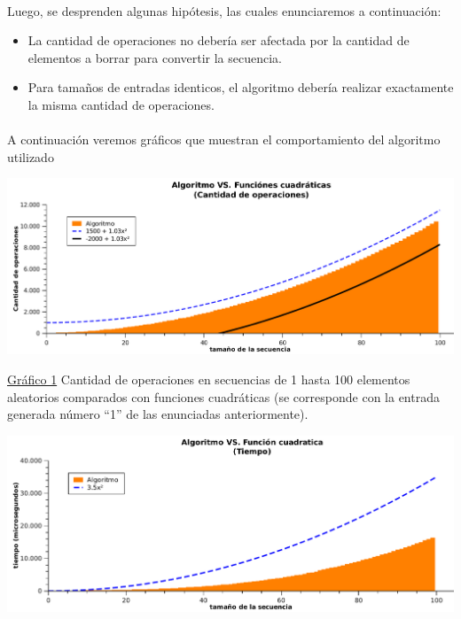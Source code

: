 \paragraph{}
Luego, se desprenden algunas hipótesis, las cuales enunciaremos a continuación:
\begin{itemize}
  
  \item La cantidad de operaciones no debería ser afectada por la cantidad de elementos a borrar para convertir la secuencia.

  \item Para tamaños de entradas identicos, el algoritmo debería realizar exactamente la misma cantidad de operaciones.

\end{itemize}




\paragraph{}
A continuación veremos gráficos que muestran el comportamiento del algoritmo utilizado


 \vspace*{1cm}
\hspace*{-2.1cm}\includegraphics[width=475pt]{../ej1/graficos/operaciones100.pdf}

\underline{Gráfico 1} Cantidad de operaciones en secuencias de 1 hasta 100 elementos aleatorios comparados con funciones cuadráticas (se corresponde con la entrada generada número ``1'' de las enunciadas anteriormente).

 \vspace*{1cm}
\hspace*{-2.1cm}\includegraphics[width=475pt]{../ej1/graficos/tiempo100.pdf}

